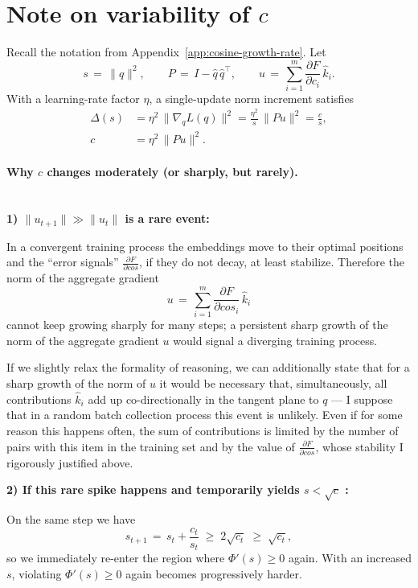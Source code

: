 \section{Note on variability of $c$}
\label{app:note-on-c-variability}

Recall the notation from Appendix~\ref{app:cosine-growth-rate}. Let
\begin{equation}
s \,=\, \|q\|^{2}, \qquad P \,=\, I - \hat q\,\hat q^{\!\top}, \qquad
u \,=\, \sum_{i=1}^{m} \frac{\partial F}{\partial c_i}\,\hat k_i .
\end{equation}
With a learning-rate factor $\eta$, a single-update norm increment satisfies
\begin{equation}
\begin{aligned}
\Delta(s) &= \eta^{2}\,\bigl\|\nabla_q L(q)\bigr\|^{2}
          = \frac{\eta^{2}}{s}\,\|Pu\|^{2}
          = \frac{c}{s}, \\
c &= \eta^{2}\,\|Pu\|^{2}.
\end{aligned}
\end{equation}

\paragraph{Why $c$ changes moderately (or sharply, but rarely).\\\\}

\textbf{1) $\|u_{t+1}\| \gg \|u_t\|$ is a rare event:}

In a convergent training process the embeddings move to their optimal positions and the ``error signals'' $\tfrac{\partial F}{\partial cos}$, if they do not decay, at least stabilize. Therefore the norm of the aggregate gradient
\begin{equation}
u \,=\, \sum_{i=1}^{m} \frac{\partial F}{\partial cos_i}\,\hat k_i
\end{equation}
cannot keep growing sharply for many steps; a persistent sharp growth of the norm of the aggregate gradient $u$ would signal a diverging training process.

If we slightly relax the formality of reasoning, we can additionally state that for a sharp growth of the norm of $u$ it would be necessary that, simultaneously, all contributions $\hat k_i$ add up co-directionally in the tangent plane to $q$ — I suppose that in a random batch collection process this event is unlikely. Even if for some reason this happens often, the sum of contributions is limited by the number of pairs with this item in the training set and by the value of $\tfrac{\partial F}{\partial cos}$, whose stability I rigorously justified above.

\textbf{2) If this rare spike happens and temporarily yields $s < \sqrt{c}$ :}

On the same step we have
\begin{equation}
s_{t+1} \,=\, s_t + \frac{c_t}{s_t} \;\ge\; 2\sqrt{c_t} \;\ge\; \sqrt{c_t} ,
\end{equation}
so we immediately re-enter the region where $\Phi'(s) \ge 0$ again. With an increased $s$, violating $\Phi'(s) \ge 0$ again becomes progressively harder.
